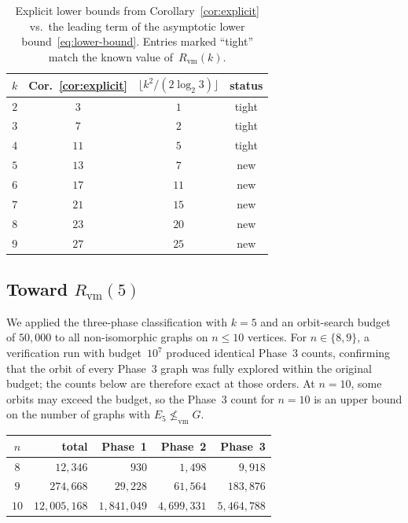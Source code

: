 \documentclass[11pt]{amsart}
\theoremstyle{definition}
\theoremstyle{remark}
\newcommand{\Rvm}{R_{\mathrm{vm}}}
\newcommand{\vm}{\leq_{\mathrm{vm}}}
\begin{document}
\begin{table}[ht]
  \centering
  \caption{Explicit lower bounds from Corollary~\ref{cor:explicit}
    vs.\ the leading term of the asymptotic lower
    bound~\eqref{eq:lower-bound}.  Entries marked ``tight'' match the
    known value of~$\Rvm(k)$.}
  \label{tab:explicit}
  \begin{tabular}{cccc}
    \toprule
    $k$ & Cor.~\ref{cor:explicit}
        & $\lfloor k^2/(2\log_2 3)\rfloor$
        & status \\
    \midrule
    $2$  & $3$   & $1$  & tight \\
    $3$  & $7$   & $2$  & tight \\
    $4$  & $11$  & $5$  & tight \\
    $5$  & $13$  & $7$  & new \\
    $6$  & $17$  & $11$ & new \\
    $7$  & $21$  & $15$ & new \\
    $8$  & $23$  & $20$ & new \\
    $9$  & $27$  & $25$ & new \\
    \bottomrule
  \end{tabular}
\end{table}


\subsection{Toward $\Rvm(5)$}\label{subsec:toward-k5}

We applied the three-phase classification with $k=5$ and an
orbit-search budget of $50{,}000$ to all non-isomorphic graphs on
$n\leq 10$ vertices.  For $n\in\{8,9\}$, a verification run with
budget~$10^7$ produced identical Phase~3 counts, confirming that the
orbit of every Phase~3 graph was fully explored within the original
budget; the counts below are therefore exact at those orders.  At
$n=10$, some orbits may exceed the budget, so the Phase~3 count for
$n=10$ is an upper bound on the number of graphs with $E_5\not\vm G$.

\begin{center}
  \begin{tabular}{crrrr}
    \toprule
    $n$ & total & Phase~1 & Phase~2 & Phase~3 \\
    \midrule
    $8$  & $12{,}346$       & $930$       & $1{,}498$     & $9{,}918$ \\
    $9$  & $274{,}668$      & $29{,}228$  & $61{,}564$    & $183{,}876$ \\
    $10$ & $12{,}005{,}168$ & $1{,}841{,}049$ & $4{,}699{,}331$ & $5{,}464{,}788$ \\
    \bottomrule
  \end{tabular}
\end{center}
\end{document}
